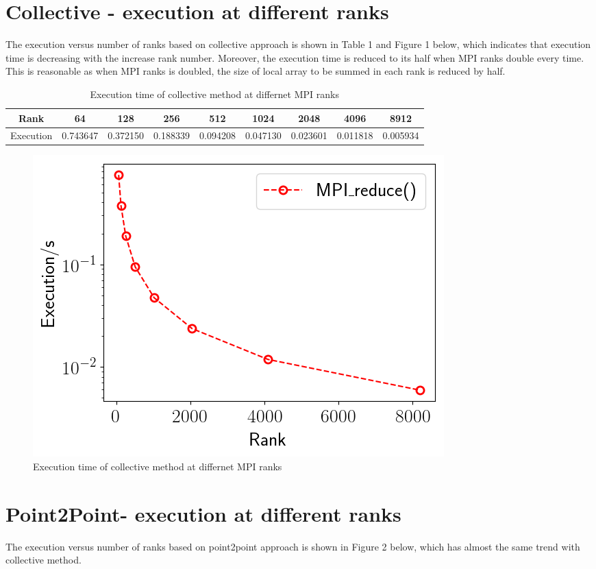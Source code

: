 \documentclass{article}
\begin{document}
\section{Collective - execution at different ranks}
The execution versus number of ranks based on collective approach is shown in Table 1 and Figure 1 below, which indicates that execution time is decreasing with the increase rank number. Moreover, the execution time is reduced to its half when MPI ranks double every time. This is reasonable as when MPI ranks is doubled, the size of local array to be summed in each rank is reduced by half.
\begin{table}[!htb]\centering
	\begin{tabular}{|c|c|c|c|c|c|c|c|c|}
		\hline
		Rank & 64 & 128 & 256 & 512 & 1024 & 2048 & 4096 & 8912\\
		\hline
		Execution & 0.743647 & 0.372150 & 0.188339 & 0.094208 & 0.047130 & 0.023601 & 0.011818 & 0.005934 \\
		\hline
	\end{tabular}
\caption{ Execution time of collective method at differnet MPI ranks}
\end{table}


\begin{figure}[!htb]
	\centering
	\includegraphics[scale=0.5]{../output/collective.png}
	\caption{ Execution time of collective method at differnet MPI ranks}
\end{figure}


\section{Point2Point- execution at different ranks}
The execution versus number of ranks based on point2point approach is shown in Figure 2 below, which has almost the same trend with collective method.
\end{document}
